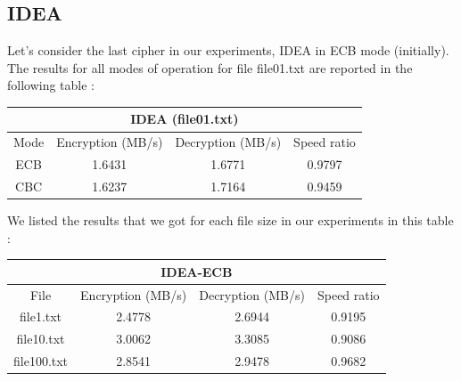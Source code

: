 \documentclass[11pt]{article}
\begin{document}
\subsection{IDEA}
Let's consider the last cipher in our experiments, IDEA in ECB mode (initially). The results for all modes of operation for file file01.txt are reported in the following table :
\begin{center}
\begin{tabular}{| c | c | c | c |}
\hline
\multicolumn{4}{|c|}{IDEA (file01.txt)} \\
\hline
Mode & Encryption (MB/s) & Decryption (MB/s) & Speed ratio\\
\hline
ECB & 1.6431 &  1.6771 &  0.9797 \\
\hline
CBC & 1.6237 & 1.7164 &  0.9459 \\
\hline
\end{tabular}
\end{center}
We listed the results that we got for each file size in our experiments in this table :
\begin{center}
\begin{tabular}{| c | c | c | c |}
\hline
\multicolumn{4}{|c|}{IDEA-ECB} \\
\hline
File & Encryption (MB/s) & Decryption (MB/s) & Speed ratio\\
\hline
file1.txt & 2.4778 & 2.6944 & 0.9195 \\
\hline
file10.txt & 3.0062 & 3.3085 & 0.9086 \\
\hline
file100.txt & 2.8541 & 2.9478 & 0.9682 \\
\hline
\end{tabular}
\end{center}
\end{document}
